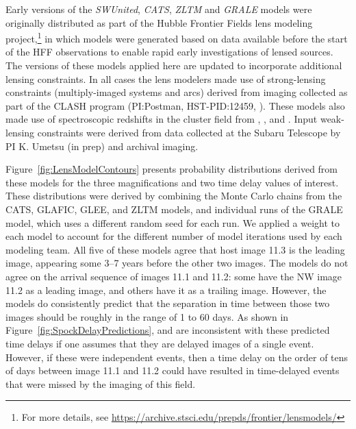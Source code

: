 Early versions of the {\it SWUnited}, {\it CATS}, {\it ZLTM} and {\it
  GRALE} models were originally distributed as part of the Hubble
Frontier Fields lens modeling project,\footnote{For more details, see
  \url{https://archive.stsci.edu/prepds/frontier/lensmodels/}} in
which models were generated based on data available before the start
of the HFF observations to enable rapid early investigations of lensed
sources. The versions of these models applied here are updated to
incorporate additional lensing constraints.  In all cases the lens
modelers made use of strong-lensing constraints (multiply-imaged
systems and arcs) derived from \HST imaging collected as part of the
CLASH program (PI:Postman, HST-PID:12459,
\citealt{Postman:2012}). These models also made use of spectroscopic
redshifts in the cluster field from \citet{Mann:2012},
\citet{Christensen:2012}, \citet{Grillo:2015} and
\citet{Caminha:2017}.  Input weak-lensing constraints were derived
from data collected at the Subaru Telescope by PI K. Umetsu (in prep)
and archival imaging.


Figure~\ref{fig:LensModelContours} presents probability distributions
derived from these models for the three magnifications and two time
delay values of interest.  These distributions were derived by
combining the Monte Carlo chains from the CATS, GLAFIC, GLEE, and ZLTM
models, and individual runs of the GRALE model, which uses a different
random seed for each run.  We applied a weight to each model to
account for the different number of model iterations used by each
modeling team. All five of these models agree that host image 11.3 is
the leading image, appearing some 3--7 years before the other two
images.  The models do not agree on the arrival sequence of images
11.1 and 11.2: some have the NW image 11.2 as a leading image, and
others have it as a trailing image.  However, the models do
consistently predict that the separation in time between those two
images should be roughly in the range of 1 to 60 days. As shown in
Figure~\ref{fig:SpockDelayPredictions}, \spockone and \spocktwo are
inconsistent with these predicted time delays if one assumes that they
are delayed images of a single event.  However, if these were
independent events, then a time delay on the order of tens of days
between image 11.1 and 11.2 could have resulted in time-delayed events
that were missed by the \HST imaging of this field.


